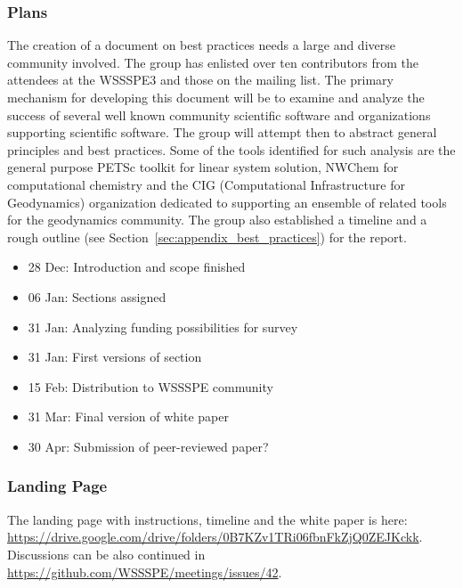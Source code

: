 \subsubsection{Plans}
The creation of a document on best practices needs a large and diverse community
involved. The group has enlisted over ten contributors from the attendees at the
WSSSPE3 and those on the mailing list. The primary mechanism for developing this
document will be to examine and analyze the success of several well known
community scientific software and organizations supporting scientific software.
The group will attempt then to abstract general principles and best practices. Some of
the tools identified for such analysis are the general purpose PETSc toolkit for
linear system solution, NWChem for computational chemistry and the CIG
(Computational Infrastructure for Geodynamics) organization dedicated to
supporting an ensemble of related tools for the geodynamics community. The group also
established a timeline and a rough outline (see
Section~\ref{sec:appendix_best_practices}) for the report.

\medskip
{}
\begin{itemize}
%
\item 28 Dec: Introduction and scope finished
\item 06 Jan: Sections assigned
\item 31 Jan: Analyzing funding possibilities for survey
\item 31 Jan: First versions of section
\item 15 Feb: Distribution to WSSSPE community
\item 31 Mar: Final version of white paper
\item 30 Apr: Submission of peer-reviewed paper?
\end{itemize}


\subsubsection{Landing Page}
The landing page with instructions, timeline and the white paper is here: \url{https://drive.google.com/drive/folders/0B7KZv1TRi06fbnFkZjQ0ZEJKckk}.
Discussions can be also continued in \url{https://github.com/WSSSPE/meetings/issues/42}.
